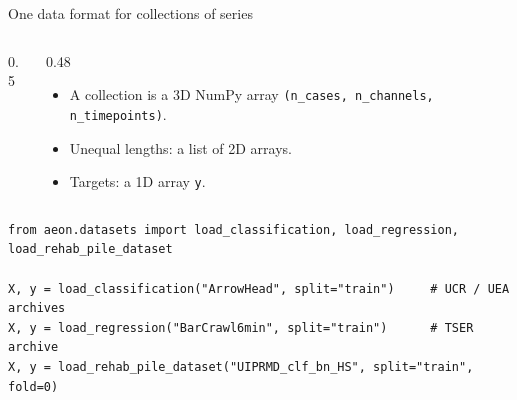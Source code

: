 \documentclass[aspectratio=169,10pt]{beamer}
\begin{document}
\begin{frame}[fragile]{One data format for collections of series}
  \begin{columns}[c]
    \begin{column}{0.5\textwidth}
    \end{column}
    \begin{column}{0.48\textwidth}
      \begin{itemize}
        \item A collection is a 3D NumPy array \texttt{(n\_cases, n\_channels, n\_timepoints)}.
        \item Unequal lengths: a list of 2D arrays.
        \item Targets: a 1D array \texttt{y}.
      \end{itemize}
    \end{column}
  \end{columns}
  \vspace{0.2cm}
\begin{lstlisting}
from aeon.datasets import load_classification, load_regression, load_rehab_pile_dataset

X, y = load_classification("ArrowHead", split="train")     # UCR / UEA archives
X, y = load_regression("BarCrawl6min", split="train")      # TSER archive
X, y = load_rehab_pile_dataset("UIPRMD_clf_bn_HS", split="train", fold=0)
\end{lstlisting}
\end{frame}
\end{document}
